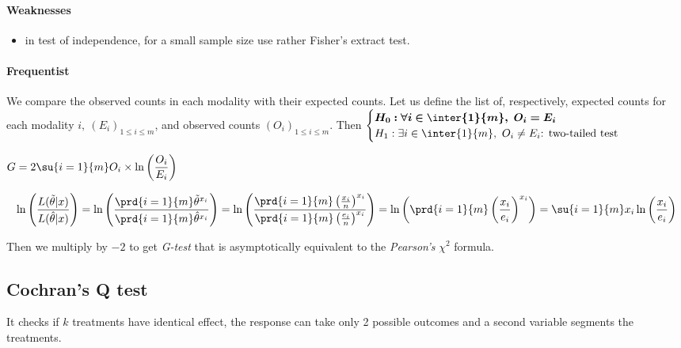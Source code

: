 \paragraph{Weaknesses}
\begin{itemize}
    \item in test of independence, for a small sample size use rather Fisher's extract 
        test.
\end{itemize}


\paragraph{Frequentist}
We compare the observed counts in each modality with their expected counts.
Let us define the list of, respectively, expected counts for each modality 
$i,~(E_{i})_{1\leq i\leq m}$, and observed counts $(O_{i})_{1\leq i\leq m}$.
Then
$\begin{cases}
    \bm{H_{0}: \forall i\in \inter{1}{m},~O_{i} = E_{i}}\\
    H_{1}: \exists i\in \inter{1}{m},~O_{i} \neq E_{i}\text{: two-tailed test} \\
\end{cases}$

\begin{center}
    $G = 2\su{i=1}{m}O_{i}\times\ln\left(\dfrac{O_{i}}{E_{i}}\right)$
\end{center}

$$
\ln\left(\dfrac{L(\tilde{\theta}|x)}{L(\hat{\theta}|x)}\right)
= \ln\left(\dfrac{\prd{i=1}{m}\tilde{\theta}^{x_{i}}}{\prd{i=1}{m}\hat{\theta}^{x_{i}}}\right)
= \ln\left(\dfrac{\prd{i=1}{m}\left(\frac{x_{i}}{n}\right)^{x_{i}}}{\prd{i=1}{m}\left(\frac{e_{i}}{n}\right)^{x_{i}}}\right)
= \ln\left(\prd{i=1}{m}\left(\dfrac{x_{i}}{e_{i}}\right)^{x_{i}}\right)
= \su{i=1}{m}x_{i}\ln\left(\dfrac{x_{i}}{e_{i}}\right)
$$

Then we multiply by $-2$ to get \emph{G-test} that is asymptotically equivalent to the 
\emph{Pearson's} $\chi^{2}$ formula.


\subsection{Cochran's Q test}
It checks if $k$ treatments have identical effect, the response can take only 2 possible 
outcomes and a second variable segments the treatments.

